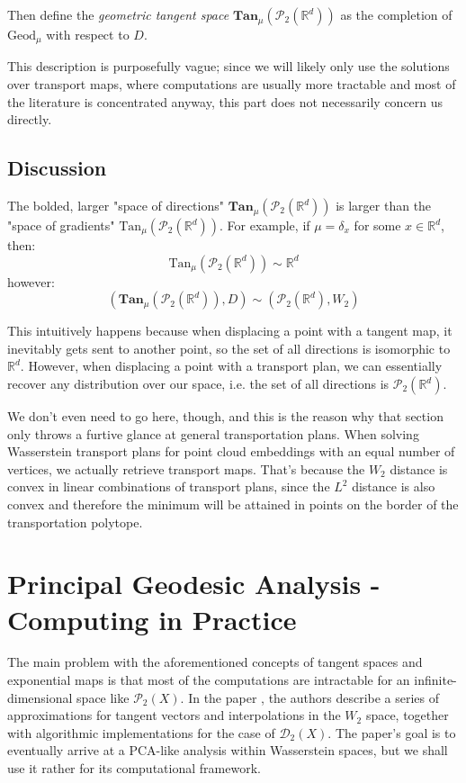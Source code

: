 \documentclass{article}
\begin{document}
Then define the \textit{geometric tangent space} $\textbf{Tan}_\mu(\mathscr{P}_2(\mathbb{R}^d))$
as the completion of $\text{Geod}_\mu$ with respect to $D$.

This description is purposefully vague; since we will likely only use the solutions
over transport maps, where computations are usually more tractable and most of 
the literature is concentrated anyway, this part does not necessarily concern 
us directly.

\subsection{Discussion}

The bolded, larger "space of directions" $\textbf{Tan}_\mu(\mathscr{P}_2(\mathbb{R}^d))$ 
is larger than the "space of gradients" $\text{Tan}_\mu(\mathscr{P}_2(\mathbb{R}^d))$.
For example, if $\mu = \delta_x$ for some $x\in \mathbb{R}^d$, then:
\[\text{Tan}_\mu(\mathscr{P}_2(\mathbb{R}^d)) \sim \mathbb{R}^d \]  
however:
\[(\textbf{Tan}_\mu(\mathscr{P}_2(\mathbb{R}^d)), D) \sim (\mathscr{P}_2(\mathbb{R}^d), W_2)  \]

This intuitively happens because when displacing a point with a tangent map,
it inevitably gets sent to another point, so the set of all directions is isomorphic to
$\mathbb{R}^d$. However, when displacing a point with a transport plan, we can
essentially recover any distribution over our space, i.e. the set of all 
directions is $\mathscr{P}_2(\mathbb{R}^d)$.

We don't even need to go here, though, and this is the reason why that section 
only throws a furtive glance at general transportation plans. When solving Wasserstein 
transport plans for point cloud embeddings with an equal number of vertices, we actually 
retrieve transport maps. That's because the $W_2$ distance is convex in linear 
combinations of transport plans, since the $L^2$ distance is also convex
and therefore the minimum will be attained in points on the border of 
the transportation polytope.

\section{Principal Geodesic Analysis - Computing in Practice}
The main problem with the aforementioned concepts of tangent spaces and exponential maps
is that most of the computations
are intractable for an infinite-dimensional space like $\mathscr{P}_2(X)$. In the paper
\cite{seguy2015principal}, the authors describe a series of approximations for 
tangent vectors and interpolations in the $W_2$ space, together with algorithmic
implementations for the case of $\mathscr{D}_2(X)$. The paper's goal is 
to eventually arrive at a PCA-like analysis within Wasserstein spaces, but 
we shall use it rather for its computational framework.
\end{document}
